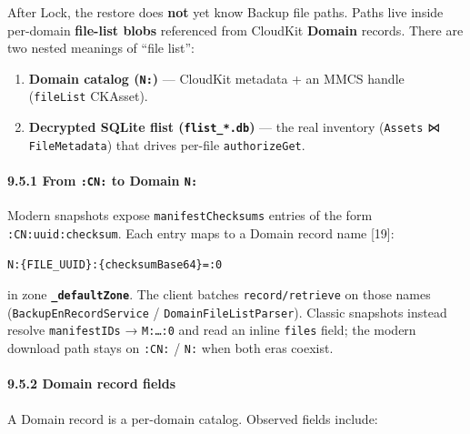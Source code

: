 \documentclass[
  english,
  10pt]{article}
\providecommand{\tightlist}{%
  \setlength{\itemsep}{0pt}\setlength{\parskip}{0pt}}
\begin{document}
After Lock, the restore does \textbf{not} yet know Backup file paths.
Paths live inside per-domain \textbf{file-list blobs} referenced from
CloudKit \textbf{Domain} records. There are two nested meanings of
``file list'':

\begin{enumerate}
\def\labelenumi{\arabic{enumi}.}
\tightlist
\item
  \textbf{Domain catalog (\texttt{N:})} --- CloudKit metadata + an MMCS
  handle (\texttt{fileList} CKAsset).
\item
  \textbf{Decrypted SQLite flist (\texttt{flist\_*.db})} --- the real
  inventory (\texttt{Assets} ⋈ \texttt{FileMetadata}) that drives
  per-file \texttt{authorizeGet}.
\end{enumerate}

\paragraph{\texorpdfstring{9.5.1 From \texttt{:CN:} to Domain
\texttt{N:}}{9.5.1 From :CN: to Domain N:}}\label{from-cn-to-domain-n}

Modern snapshots expose \texttt{manifestChecksums} entries of the form
\texttt{:CN:uuid:checksum}. Each entry maps to a Domain record name
{[}19{]}:

\begin{verbatim}
N:{FILE_UUID}:{checksumBase64}=:0
\end{verbatim}

in zone \textbf{\texttt{\_defaultZone}}. The client batches
\texttt{record/retrieve} on those names (\texttt{BackupEnRecordService}
/ \texttt{DomainFileListParser}). Classic snapshots instead resolve
\texttt{manifestIDs} → \texttt{M:…:0} and read an inline \texttt{files}
field; the modern download path stays on \texttt{:CN:} / \texttt{N:}
when both eras coexist.

\paragraph{9.5.2 Domain record fields}\label{domain-record-fields}

A Domain record is a per-domain catalog. Observed fields include:
\end{document}

